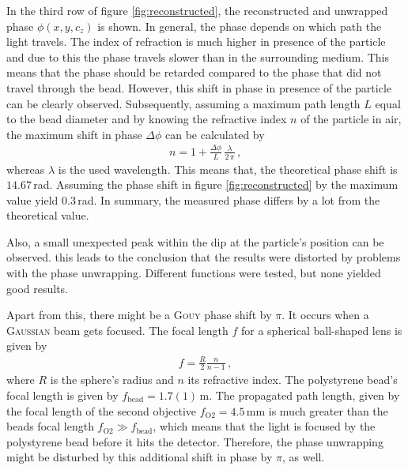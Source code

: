 \documentclass{article}
\begin{document}
In the third row of figure \ref{fig:reconstructed}, the reconstructed and unwrapped phase $\phi(x,y,c_z)$ is shown.
In general, the phase depends on which path the light travels. The index of refraction is much higher in presence of the particle and due to this the phase travels slower than in the surrounding medium. This means that the phase should be retarded compared to the phase that did not travel through the bead.
However, this shift in phase in presence of the particle can be clearly observed. Subsequently, assuming a maximum path length $L$ equal to the bead diameter and by knowing the refractive index $n$ of the particle in air, the maximum shift in phase $\Delta\phi$ can be calculated by 
\begin{align}
    n=1+\frac{\Delta\phi}{L}\,\frac{\lambda}{2\,\pi}\,,
\end{align}
whereas $\lambda$ is the used wavelength. This means that, the theoretical phase shift is $14.67\,$rad. Assuming the phase shift in figure \ref{fig:reconstructed} by the maximum value yield 0.3\,rad. In summary, the measured phase differs by a lot from the theoretical value.

Also, a small unexpected peak within the dip at the particle's position can be observed. this leads to the conclusion that the results were distorted by problems with the phase unwrapping. Different functions were tested, but none yielded good results.

Apart from this, there might be a \textsc{Gouy} phase shift by $\pi$. It occurs when a \textsc{Gaussian} beam gets focused.
The focal length $f$ for a spherical ball-shaped lens is given by \cite{balllens}
\begin{align}
    f=\frac{R}{2}\frac{n}{n-1}\,,
\end{align}
where $R$ is the sphere's radius and $n$ its refractive index. The polystyrene bead's focal length is given by $f_\text{bead}=1.7(1)\,$\textmu m. The propagated path length, given by the focal length of the second objective $f_\text{O2}=4.5$\,mm is much greater than the beads focal length $f_\text{O2}\gg f_\text{bead}$, which means that the light is focused by the polystyrene bead before it hits the detector. Therefore, the phase unwrapping might be disturbed by this additional shift in phase by $\pi$, as well. 
\end{document}
